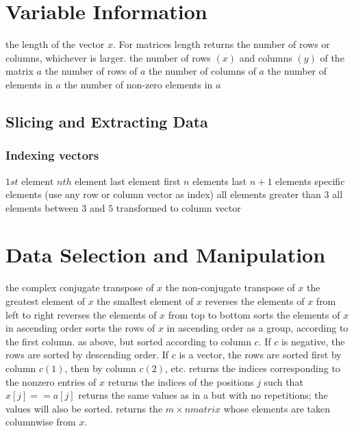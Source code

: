 \section{Variable Information}{}
	{the length of the vector $x$. For matrices length returns the number of rows or columns, whichever is larger.}
	{the number of rows $(x)$ and columns $(y)$ of the matrix $a$}
	{the number of rows of $a$}
	{the number of columns of $a$}
	{the number of elements in $a$}
	{the number of non-zero elements in $a$}

\subsection{Slicing and Extracting Data }{}
\subsubsection{Indexing vectors}{}
	{$1st$ element}
	{$nth$ element}
	{last element}
	{first $n$ elements}
	{last $n+1$ elements}
	{specific elements (use any row or column vector as index)}
	{all elements greater than $3$}
	{all elements between $3$ and $5$}
	{transformed to column vector}

\section{Data Selection and Manipulation}{}
	{the complex conjugate transpose of $x$}
	{the non-conjugate transpose of $x$}
	{the greatest element of $x$}
	{the smallest element of $x$}
	{reverses the elements of $x$ from left to right}
	{reverses the elements of $x$ from top to bottom}
	{sorts the elements of $x$ in ascending order}
	{sorts the rows of $x$ in ascending order as a group, according to the first column.}
	{as above, but sorted according to column $c$. If $c$ is negative, the rows are sorted by descending order. If $c$ is a vector, the rows are sorted first by column $c(1)$, then by column $c(2)$, etc.}
	{returns the indices corresponding to the nonzero entries of $x$}
	{returns the indices of the positions $j$ such that $x[j]==a[j]$}
	{returns the same values as in a but with no repetitions; the values will also be sorted.}
	{returns the $m  \times  n matrix$ whose elements are taken columnwise from $x$.}

